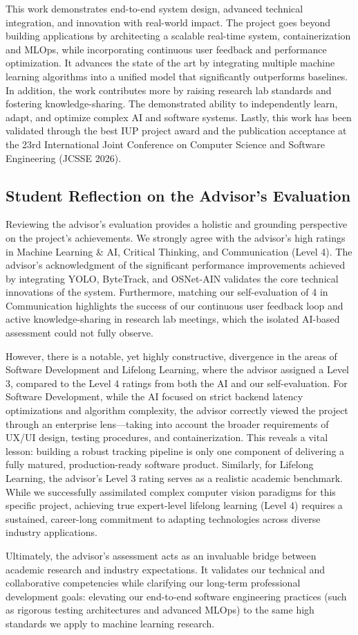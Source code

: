 This work demonstrates end-to-end system design, advanced technical integration, and innovation with real-world impact. The project goes beyond building applications by architecting a scalable real-time system, containerization and MLOps, while incorporating continuous user feedback and performance optimization. It advances the state of the art by integrating multiple machine learning algorithms into a unified model that significantly outperforms baselines. In addition, the work contributes more by raising research lab standards and fostering knowledge-sharing. The demonstrated ability to independently learn, adapt, and optimize complex AI and software systems.  Lastly, this work has been validated through the best IUP project award and the publication acceptance at the 23rd International Joint Conference on Computer Science and Software Engineering (JCSSE 2026).

\subsection{Student Reflection on the Advisor’s Evaluation}
Reviewing the advisor's evaluation provides a holistic and grounding perspective on the project's achievements. We strongly agree with the advisor’s high ratings in Machine Learning \& AI, Critical Thinking, and Communication (Level 4). The advisor’s acknowledgment of the significant performance improvements achieved by integrating YOLO, ByteTrack, and OSNet-AIN validates the core technical innovations of the system. Furthermore, matching our self-evaluation of 4 in Communication highlights the success of our continuous user feedback loop and active knowledge-sharing in research lab meetings, which the isolated AI-based assessment could not fully observe.

However, there is a notable, yet highly constructive, divergence in the areas of Software Development and Lifelong Learning, where the advisor assigned a Level 3, compared to the Level 4 ratings from both the AI and our self-evaluation. For Software Development, while the AI focused on strict backend latency optimizations and algorithm complexity, the advisor correctly viewed the project through an enterprise lens---taking into account the broader requirements of UX/UI design, testing procedures, and containerization. This reveals a vital lesson: building a robust tracking pipeline is only one component of delivering a fully matured, production-ready software product. Similarly, for Lifelong Learning, the advisor's Level 3 rating serves as a realistic academic benchmark. While we successfully assimilated complex computer vision paradigms for this specific project, achieving true expert-level lifelong learning (Level 4) requires a sustained, career-long commitment to adapting technologies across diverse industry applications.

Ultimately, the advisor's assessment acts as an invaluable bridge between academic research and industry expectations. It validates our technical and collaborative competencies while clarifying our long-term professional development goals: elevating our end-to-end software engineering practices (such as rigorous testing architectures and advanced MLOps) to the same high standards we apply to machine learning research.
